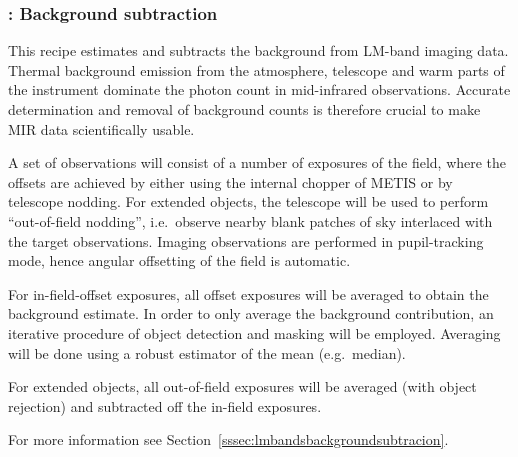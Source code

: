 \clearpage
\subsubsection{: Background subtraction}
\label{lm_img_background}
\label{rec:lm_img_background}
\label{sssec:lm_img_background}
\label{metis_lm_img_background}
\label{rec:metis_lm_img_background}
\label{sssec:metis_lm_img_background}

This recipe estimates and subtracts the background from LM-band
imaging data. Thermal background emission from the atmosphere,
telescope and warm parts of the instrument dominate the photon count
in mid-infrared observations. Accurate determination and removal of
background counts is therefore crucial to make MIR data scientifically
usable.

A set of observations will consist of a number of exposures
of the field, where the offsets are achieved by either using the internal
chopper of METIS or by telescope nodding. For extended objects, the
telescope will be used to perform ``out-of-field nodding'', i.e.\
observe nearby blank patches of sky interlaced with the target
observations. Imaging observations are performed in pupil-tracking
mode, hence angular offsetting of the field is automatic.

For in-field-offset exposures, all offset exposures will be
averaged to obtain the background estimate. In order to only average
the background contribution, an iterative procedure of object
detection and masking will be employed. Averaging will be done using a
robust estimator of the mean (e.g.\ median).

For extended objects, all out-of-field exposures will be averaged
(with object rejection) and subtracted off the in-field exposures.

For more information see Section~\ref{sssec:lmbandsbackgroundsubtracion}.

%

